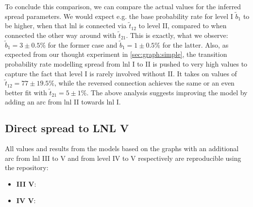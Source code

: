 \documentclass[\relativeRoot/main.tex]{subfiles}
\begin{document}
To conclude this comparison, we can compare the actual values for the inferred spread parameters. We would expect e.g. the base probability rate for level I $\tilde{b}_1$ to be higher, when that \gls{lnl} is connected via $\tilde{t}_{12}$ to level II, compared to when connected the other way around with $\tilde{t}_{21}$. This is exactly, what we observe: $\tilde{b}_1 = 3 \pm 0.5 \%$ for the former case and $\tilde{b}_1 = 1 \pm 0.5 \%$ for the latter. Also, as expected from our thought experiment in \cref{sec:graph:simple}, the transition probability rate modelling spread from \gls{lnl} I to II is pushed to very high values to capture the fact that level I is rarely involved without II. It takes on values of $\tilde{t}_{12} = 77 \pm 19.5 \%$, while the reversed connection achieves the same or an even better fit with $\tilde{t}_{21} = 5 \pm 1 \%$. The above analysis suggests improving the model by adding an arc from \gls{lnl} II towards \gls{lnl} I.

\subsection{Direct spread to LNL V}
\label{subsec:graph:extended:toV}

\begin{tcolorbox}[title=\faIcon{recycle} Reproducibility, parbox=false]
    All values and results from the models based on the graphs with an additional arc from \gls{lnl} III to V and from level IV to V respectively are reproducible using the  repository:

    \begin{itemize}
        \item \textbf{III  V}: 
        \item \textbf{IV  V}: 
    \end{itemize}
\end{tcolorbox}
\end{document}
